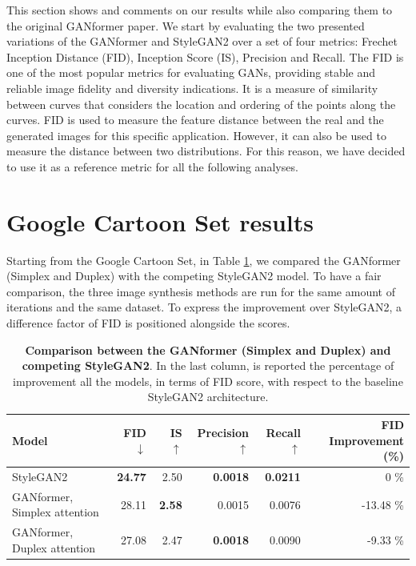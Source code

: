 \documentclass{article}
\begin{document}
This section shows and comments on our results while also comparing them to the original 
GANformer paper. We start by evaluating the two presented variations of the GANformer and StyleGAN2 over a set of four metrics: Frechet Inception Distance (FID), Inception Score (IS), Precision and Recall. The FID is one of the most popular metrics for evaluating GANs, providing stable and reliable image fidelity and diversity indications. It is a measure of similarity between curves that considers the location and ordering of the points along the curves. FID is used to measure the feature distance between the real and the generated images for this specific application. However, it can also be used to measure the distance between two distributions.
For this reason, we have decided to use it as a reference metric for all the following analyses. 

\section{Google Cartoon Set results}\label{sec:cartoon_results}
Starting from the Google Cartoon Set, in Table \ref{tab:our-results}, we compared the GANformer (Simplex and Duplex) with the competing StyleGAN2 model. 
To have a fair comparison, the three image synthesis methods are run for the same amount of 
iterations and the same dataset. To express the improvement over StyleGAN2, a difference factor of 
FID is positioned alongside the scores. 
\begin{table}[htb]
	\centering
	\caption{\textbf{Comparison between the GANformer (Simplex and Duplex) and competing StyleGAN2}. In the last column, is reported the percentage of improvement all the models, in terms of FID score, with respect to the baseline StyleGAN2 architecture.}
	\label{tab:our-results}
	\vspace{3mm}
	\small
	\begin{tabular}{l|rrrrr}
		\toprule
		\textbf{Model}  & \textbf{FID $\downarrow$}  & \textbf{IS $\uparrow$} & 
		\textbf{Precision$\uparrow$}  & \textbf{Recall $\uparrow$} & \textbf{FID Improvement (\%)}\\ 
		\midrule
		StyleGAN2                    				&  \textbf{24.77} & 2.50 & \textbf{0.0018} & \textbf{0.0211} & 0 \%\\ 
		GANformer, Simplex attention & 28.11 & \textbf{2.58} & 0.0015 & 0.0076 & -13.48 \%\\ 
		GANformer, Duplex attention  & 27.08 & 2.47 & \textbf{0.0018} & 0.0090 & -9.33  \%\\ 
		\bottomrule
	\end{tabular}
\end{table}
\end{document}
